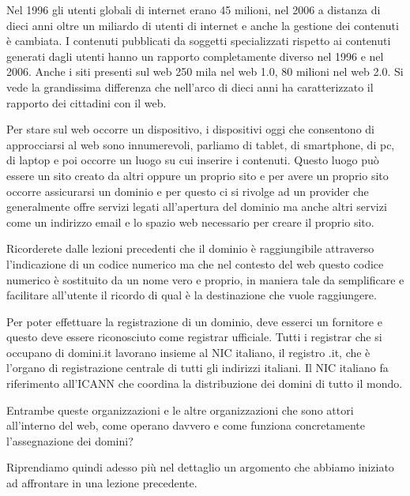   Nel 1996 gli utenti globali di internet erano 45 milioni, nel 2006 a distanza di dieci anni oltre un miliardo di utenti di internet e anche la gestione dei contenuti è cambiata. I contenuti pubblicati da soggetti specializzati rispetto ai contenuti generati dagli utenti hanno un rapporto completamente diverso nel 1996 e nel 2006. Anche i siti presenti sul web 250 mila nel web 1.0, 80 milioni nel web 2.0. Si vede la grandissima differenza che nell'arco di dieci anni ha caratterizzato il rapporto dei cittadini con il web.\par
  Per stare sul web occorre un dispositivo, i dispositivi oggi che consentono di approcciarsi al web sono innumerevoli, parliamo di tablet, di smartphone, di pc, di laptop e poi occorre un luogo su cui inserire i contenuti. Questo luogo può essere un sito creato da altri oppure un proprio sito e per avere un proprio sito occorre assicurarsi un dominio e per questo ci si rivolge ad un provider che generalmente offre servizi legati all'apertura del dominio ma anche altri servizi come un indirizzo email e lo spazio web necessario per creare il proprio sito.\par 
  Ricorderete dalle lezioni precedenti che il dominio è raggiungibile attraverso l'indicazione di un codice numerico ma che nel contesto del web questo codice numerico è sostituito da un nome vero e proprio, in maniera tale da semplificare e facilitare all'utente il ricordo di qual è la destinazione che vuole raggiungere.\par
  Per poter effettuare la registrazione di un dominio, deve esserci un fornitore e questo deve essere riconosciuto come registrar ufficiale. Tutti i registrar che si occupano di domini.it lavorano insieme al NIC italiano, il registro .it, che è l'organo di registrazione centrale di tutti gli indirizzi italiani. Il NIC italiano fa riferimento all'ICANN che coordina la distribuzione dei domini di tutto il mondo.\par
  Entrambe queste organizzazioni e le altre organizzazioni che sono attori all'interno del web, come operano davvero e come funziona concretamente l'assegnazione dei domini?\par
  Riprendiamo quindi adesso più nel dettaglio un argomento che abbiamo iniziato ad affrontare in una lezione precedente.\par 
